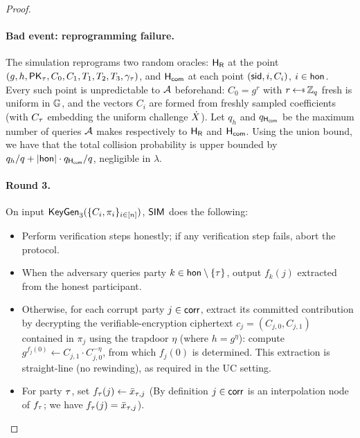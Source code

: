 \begin{proof}
    \paragraph{\bf Bad event: reprogramming failure.}
    The simulation reprograms two random oracles: $\mathsf{H_{\mathsf{R}}}$ at the point
    $(g, h, \mathsf{PK}_\tau, C_0, C_1, T_1, T_2, T_3, \gamma_\tau)$,
    and $\mathsf{H_{\mathsf{com}}}$ at each point $(\mathsf{sid}, i, C_i)$, $i \in \mathsf{hon}$.
    Every such point is unpredictable to $\mathcal{A}$ beforehand: $C_0 = g^{r}$ with $r \rgets \Zq$ fresh is
    uniform in $\mathbb{G}$, and the vectors $C_i$ are formed from freshly sampled coefficients (with
    $C_\tau$ embedding the uniform challenge $\dot{X}$). Let $q_h$ and $q_{\mathsf{H_{\mathsf{com}}}}$ be the
    maximum number of queries $\mathcal{A}$ makes respectively to $\mathsf{H_{\mathsf{R}}}$ and $\mathsf{H_{\mathsf{com}}}$. Using the union bound,
    we have that the total collision probability is upper bounded by
    $q_h/q + \lvert\mathsf{hon}\rvert \cdot q_{\mathsf{H_{\mathsf{com}}}}/q$, negligible in $\lambda$.

    \paragraph{\bf Round 3.}
    On input $\mathsf{KeyGen}_3(\{C_i, \pi_i\}_{i\in[n]})$,
    $\mathsf{SIM}$ does the following:
    \begin{itemize}
      \item Perform verification steps honestly;
        if any verification step fails, abort the protocol.
      \item When the adversary queries party $k \in \mathsf{hon}\setminus\{\tau\}$, output $f_k(j)$ extracted from the honest participant.
        \item Otherwise, for each corrupt party $j \in \mathsf{corr}$, extract its committed contribution by
          decrypting the verifiable-encryption ciphertext $c_j = (C_{j,0}, C_{j,1})$ contained in $\pi_j$
          using the trapdoor $\eta$ (where $h = g^{\eta}$): compute $g^{f_j(0)} \gets C_{j,1} \cdot C_{j,0}^{-\eta}$,
          from which $f_j(0)$ is determined. This extraction is straight-line (no rewinding), as required in the UC setting.
        \item For party $\tau$, set $f_\tau(j) \gets \bar{x}_{\tau,j}$
        (By definition $j \in \mathsf{corr}$ is an interpolation node of $f_\tau$;
        we have $f_\tau(j) = \bar{x}_{\tau,j}$).
    \end{itemize}


\end{proof}
